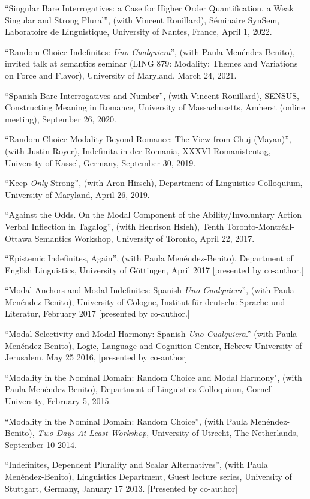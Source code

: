 \documentclass[11pt]{article}
\begin{document}
``Singular Bare Interrogatives: a Case for Higher Order Quantification, a Weak Singular and Strong Plural'', (with Vincent Rouillard), S\'eminaire SynSem, Laboratoire de Linguistique, University of Nantes, France, April 1, 2022.

``Random Choice Indefinites: \textit{Uno Cualquiera}'', (with Paula Men\'endez-Benito), invited talk at semantics seminar (LING 879: Modality: Themes and Variations on Force and Flavor), University of Maryland, March 24, 2021.

``Spanish Bare Interrogatives and Number'', (with Vincent Rouillard), SENSUS, Constructing Meaning in Romance, University of Massachusetts, Amherst (online meeting), September 26, 2020.

``Random Choice Modality Beyond Romance: The View from Chuj (Mayan)'', (with Justin Royer), Indefinita in der Romania, XXXVI Romanistentag, University of Kassel, Germany, September 30, 2019.

``Keep \textit{Only} Strong'', (with Aron Hirsch), Department of Linguistics Colloquium, University of Maryland, April 26, 2019.

``Against the Odds. On the Modal Component of the Ability/Involuntary Action Verbal Inflection in Tagalog'', (with Henrison Hsieh), Tenth Toronto-Montr\'eal-Ottawa Semantics Workshop, University of
Toronto, April 22, 2017.

``Epistemic Indefinites, Again'', (with Paula Men\'endez-Benito), Department of English Linguistics, University of G\"{o}ttingen, April 2017 [presented by co-author.]

``Modal Anchors and Modal Indefinites: Spanish \textit{Uno Cualquiera}'', (with Paula Men\'endez-Benito), University of Cologne, Institut f\"ur deutsche Sprache und Literatur, February 2017 [presented by co-author.]

``Modal Selectivity and Modal Harmony: Spanish \textit{Uno Cualquiera}.'' (with Paula Men\'endez-Benito), Logic, Language and Cognition Center, Hebrew University of Jerusalem, May 25 2016, [presented by co-author]

``Modality in the Nominal Domain: Random Choice and Modal Harmony", (with Paula Men\'endez-Benito), Department of Linguistics Colloquium, Cornell University, February 5, 2015.

``Modality in the Nominal Domain: Random Choice'',
(with Paula Men\'endez-Benito), \textit{Two Days At Least Workshop},
University of Utrecht, The Netherlands, September 10 2014.

``Indefinites, Dependent Plurality and Scalar
Alternatives'', (with Paula Men\'endez-Benito), Linguistics Department, Guest lecture series, University of Stuttgart, Germany, January 17 2013. [Presented by co-author]
\end{document}

